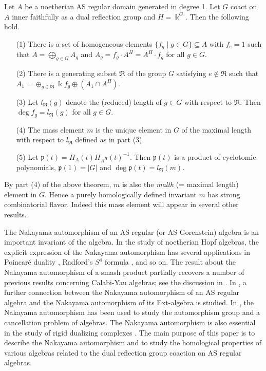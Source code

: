 \begin{theorem}
\label{xxthm0.3} Let $A$ be a noetherian AS regular domain 
generated in degree 1. Let $G$ coact on $A$ inner faithfully 
as a dual reflection group and $H=\Bbbk^G$. Then the following hold.
\begin{enumerate}
\item[(1)]
There is a set of homogeneous elements $\{ f_{g}\mid g\in G\}\subseteq A$ 
with $f_e=1$ such that $A=\bigoplus_{g\in G} A_g$ and 
$A_g=f_g \cdot A^H=A^H \cdot f_g$ for all $g\in G$. 
\item[(2)]
There is a generating subset $\Re$ of the group $G$ satisfying
$e\not\in \Re$ such that $A_1=\oplus_{g\in \Re} \Bbbk f_g \oplus (A_1\cap A^H)$.
\item[(3)]
Let ${l_{\Re}}(g)$ denote the (reduced) length of $g\in G$ with respect to 
$\Re$. Then $\deg f_g={l_{\Re}}(g)$ for all $g\in G$.
\item[(4)]
The mass element $m$ is the unique element in $G$ of the maximal length with 
respect to ${l_{\Re}}$ defined as in part {\rm{(3)}}.
\item[(5)]
Let ${\mathfrak{p}}(t)=H_{A}(t) H_{A^H}(t)^{-1}$. Then ${\mathfrak{p}}(t)$ is a product 
of cyclotomic polynomials, ${\mathfrak{p}}(1)=|G|$ and $\deg {\mathfrak{p}}(t)={l_{\Re}}(m)$.
\end{enumerate}
\end{theorem}

By part (4) of the above theorem, $m$ is also the {\it malth} (= maximal length) 
element in $G$. Hence a purely homologically defined invariant $m$ has strong 
combinatorial flavor. Indeed this mass element will appear in several 
other results.

The Nakayama automorphism of an AS regular (or AS Gorenstein) algebra is an 
important invariant of the algebra. In the study of noetherian 
Hopf algebras, the explicit expression of the Nakayama automorphism has several 
applications in Poincar{\'e} duality \cite[Corollary 0.4]{BZ}, Radford's $S^4$ 
formula \cite[Theorem 0.6]{BZ}, and so on. The result about the Nakayama 
automorphism of a smash product \cite[Theorem 0.2]{RRZ2} partially recovers  a 
number of previous results concerning Calabi-Yau algebras; see the discussion in 
\cite[Introduction]{RRZ2}. 
In \cite{RRZ3}, a further connection between the Nakayama automorphism 
of an AS regular algebra and the Nakayama automorphism of  its Ext-algebra
is studied. In \cite{LMZ}, the Nakayama automorphism 
has been used to study the automorphism group and  a cancellation problem
of algebras.  The Nakayama 
automorphism is also essential in the study of 
rigid dualizing complexes \cite{BZ, VdB}. The main purpose of this paper is to 
describe the Nakayama automorphism and to study the homological properties of 
various algebras related to the dual reflection group coaction on AS regular algebras. 

